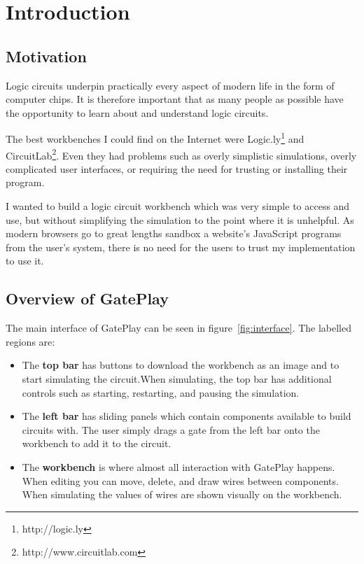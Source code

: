 \chapter{Introduction}

\section{Motivation}
Logic circuits underpin practically every aspect of modern life in the form of computer chips. It is therefore important that as many people as possible have the opportunity to learn about and understand logic circuits.

The best workbenches I could find on the Internet were Logic.ly\footnote{http://logic.ly} and CircuitLab\footnote{http://www.circuitlab.com}. Even they had problems such as overly simplistic simulations, overly complicated user interfaces, or requiring the need for trusting or installing their program.

I wanted to build a logic circuit workbench which was very simple to access and use, but without simplifying the simulation to the point where it is unhelpful. As modern browsers go to great lengths sandbox a website's JavaScript programs from the user's system, there is no need for the users to trust my implementation to use it.

\section{Overview of GatePlay}
The main interface of GatePlay can be seen in figure~\ref{fig:interface}. The labelled regions are:

\begin{itemize}
	\item[1] The \textbf{top bar} has buttons to download the workbench as an image and to start simulating the circuit.When simulating, the top bar has additional controls such as starting, restarting, and pausing the simulation.
	\item[2] The \textbf{left bar} has sliding panels which contain components available to build circuits with. The user simply drags a gate from the left bar onto the workbench to add it to the circuit.
	\item[3] The \textbf{workbench} is where almost all interaction with GatePlay happens. When editing you can move, delete, and draw wires between components. When simulating the values of wires are shown visually on the workbench.
\end{itemize}

